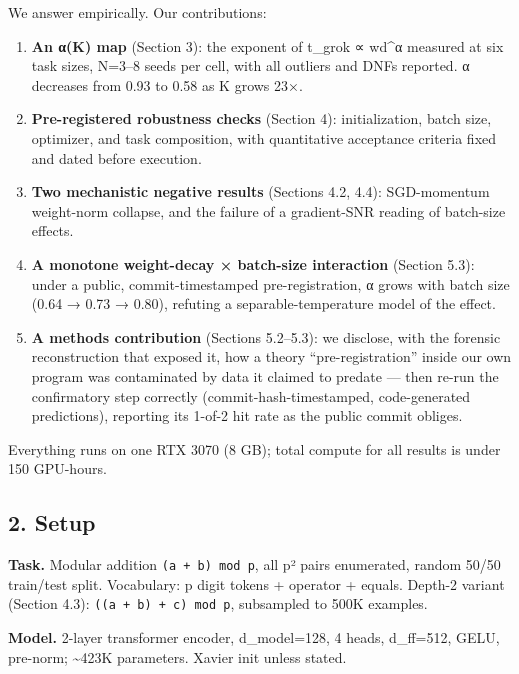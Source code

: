 \documentclass[
  11pt,
]{article}
\providecommand{\tightlist}{%
  \setlength{\itemsep}{0pt}\setlength{\parskip}{0pt}}
\begin{document}
We answer empirically. Our contributions:

\begin{enumerate}
\def\labelenumi{\arabic{enumi}.}
\tightlist
\item
  \textbf{An α(K) map} (Section 3): the exponent of t\_grok ∝ wd\^{}α
  measured at six task sizes, N=3--8 seeds per cell, with all outliers
  and DNFs reported. \textbar α\textbar{} decreases from 0.93 to 0.58 as
  K grows 23×.
\item
  \textbf{Pre-registered robustness checks} (Section 4): initialization,
  batch size, optimizer, and task composition, with quantitative
  acceptance criteria fixed and dated before execution.
\item
  \textbf{Two mechanistic negative results} (Sections 4.2, 4.4):
  SGD-momentum weight-norm collapse, and the failure of a gradient-SNR
  reading of batch-size effects.
\item
  \textbf{A monotone weight-decay × batch-size interaction} (Section
  5.3): under a public, commit-timestamped pre-registration,
  \textbar α\textbar{} grows with batch size (0.64 → 0.73 → 0.80),
  refuting a separable-temperature model of the effect.
\item
  \textbf{A methods contribution} (Sections 5.2--5.3): we disclose, with
  the forensic reconstruction that exposed it, how a theory
  ``pre-registration'' inside our own program was contaminated by data
  it claimed to predate --- then re-run the confirmatory step correctly
  (commit-hash-timestamped, code-generated predictions), reporting its
  1-of-2 hit rate as the public commit obliges.
\end{enumerate}

Everything runs on one RTX 3070 (8 GB); total compute for all results is
under 150 GPU-hours.

\subsection{2. Setup}\label{setup}

\textbf{Task.} Modular addition \texttt{(a\ +\ b)\ mod\ p}, all p² pairs
enumerated, random 50/50 train/test split. Vocabulary: p digit tokens +
operator + equals. Depth-2 variant (Section 4.3):
\texttt{((a\ +\ b)\ +\ c)\ mod\ p}, subsampled to 500K examples.

\textbf{Model.} 2-layer transformer encoder, d\_model=128, 4 heads,
d\_ff=512, GELU, pre-norm; \textasciitilde423K parameters. Xavier init
unless stated.
\end{document}
